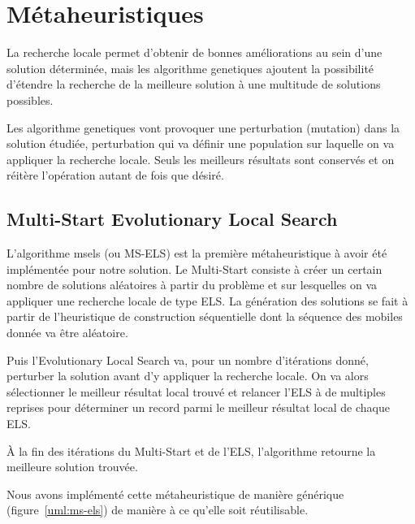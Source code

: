 	\section{Métaheuristiques}

		La recherche locale permet d'obtenir de bonnes améliorations au sein d'une solution déterminée, mais les \glspl{algorithme genetique} ajoutent la possibilité d'étendre la recherche de la meilleure solution à une multitude de solutions possibles.

		Les \glspl{algorithme genetique} vont provoquer une perturbation (mutation) dans la solution étudiée, perturbation qui va définir une population sur laquelle on va appliquer la recherche locale. Seuls les meilleurs résultats sont conservés et on réitère l'opération autant de fois que désiré.

		\subsection{Multi-Start Evolutionary Local Search}

			L'algorithme \acrlong{msels} (ou MS-ELS) est la première métaheuristique à avoir été implémentée pour notre solution. Le Multi-Start consiste à créer un certain nombre de solutions aléatoires à partir du problème et sur lesquelles on va appliquer une recherche locale de type ELS. La génération des solutions se fait à partir de l'heuristique de construction séquentielle dont la séquence des mobiles donnée va être aléatoire.

			Puis l'Evolutionary Local Search va, pour un nombre d'itérations donné, perturber la solution avant d'y appliquer la recherche locale. On va alors sélectionner le meilleur résultat local trouvé et relancer l'ELS à de multiples reprises pour déterminer un record parmi le meilleur résultat local de chaque ELS.

			À la fin des itérations du Multi-Start et de l'ELS, l'algorithme retourne la meilleure solution trouvée.

			Nous avons implémenté cette métaheuristique de manière générique (figure~\ref{uml:ms-els}) de manière à ce qu'elle soit réutilisable.

